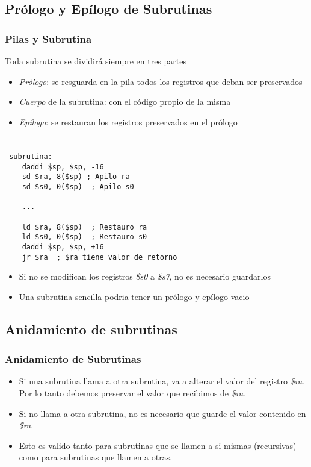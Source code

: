 \documentclass{beamer}
\begin{document}
\subsection{Prólogo y Epílogo de Subrutinas}

\begin{frame}
\frametitle{Pilas y Subrutina}
Toda subrutina se dividirá siempre en tres partes
\begin{itemize}
\item \emph{Prólogo}: se resguarda en la pila todos los registros que deban ser preservados
\item \emph{Cuerpo} de la subrutina: con el código propio de la misma
\item \emph{Epílogo}: se restauran los registros preservados en el prólogo
\end{itemize}
\end{frame}

\begin{frame}[fragile]
\frametitle{}
\tiny{
\begin{block}{}
\begin{lstlisting}[basicstyle=\ttfamily,keywordstyle=\color{blue}]

 subrutina:
    daddi $sp, $sp, -16 
    sd $ra, 8($sp) ; Apilo ra
    sd $s0, 0($sp)  ; Apilo s0
	
    ...

    ld $ra, 8($sp)  ; Restauro ra
    ld $s0, 0($sp)  ; Restauro s0
    daddi $sp, $sp, +16
    jr $ra  ; $ra tiene valor de retorno
\end{lstlisting}
\end{block}
}
\begin{itemize}
\item Si no se modifican los registros \emph{\$s0} a \emph{\$s7}, no es necesario guardarlos
\item Una subrutina sencilla podria tener un prólogo y epílogo vacio
\end{itemize}

\end{frame}

\subsection{Anidamiento de subrutinas}
\begin{frame}
\frametitle{Anidamiento de Subrutinas}

\begin{itemize}
\item Si una subrutina llama a otra subrutina, va a alterar el valor del registro \emph{\$ra}. Por lo tanto debemos preservar el valor que recibimos de \emph{\$ra}.
\item Si no llama a otra subrutina, no es necesario que guarde el valor contenido en \emph{\$ra}.
\item Esto es valido tanto para subrutinas que se llamen a si mismas (recursivas) como para subrutinas que llamen a otras.
\end{itemize}

\end{frame}
\end{document}
